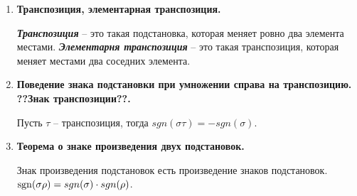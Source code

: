 \begin{enumerate}
	\item \textbf{Транспозиция, элементарная транспозиция.}
	
	\textit{\textbf{Транспозиция}} -- это такая подстановка, которая меняет ровно два элемента местами.
	\textit{\textbf{Элементарня транспозиция}} -- это такая транспозиция, которая меняет местами два соседних элемента.
	
	
	\item \textbf{Поведение знака подстановки при умножении справа на транспозицию. ??Знак транспозиции??.}
	
	Пусть $\tau$ -- транспозиция, тогда $sgn(\sigma \tau) = -sgn(\sigma)$.
	
	\item \textbf{Теорема о знаке произведения двух подстановок.}
	\begin{Theorem}
		Знак произведения подстановок есть произведение знаков подстановок. $\operatorname{\mathop{sgn}}(\sigma \rho) = sgn(\sigma) \cdot sgn(\rho)$.
	\end{Theorem}

\end{enumerate}


